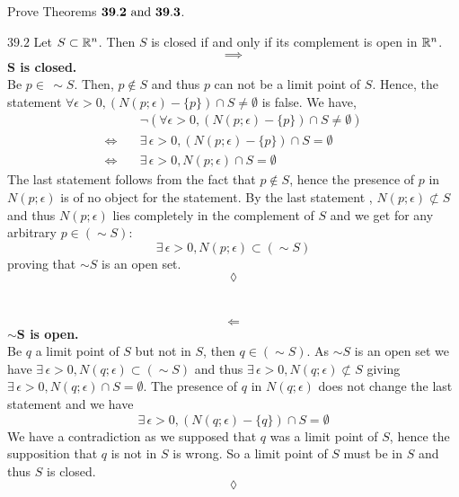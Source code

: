 \subsection{}
\begin{tcolorbox}
Prove Theorems $\mathbf{39.2}\text{ and } \mathbf{39.3}$.
\end{tcolorbox}
$$ $$
$\mathbf{39.2}$ Let $S\subset \mathbb{R}^n$. Then $S$ is closed if and only if its complement is open in $\mathbb{R}^n$.
$$\implies$$
\textbf{$\mathbf{S}$ is closed.}\\
Be $p\in \, \sim S$. Then, $p\not \in  S$ and thus $p$ can not be a limit point of $S$. Hence, the statement $\forall \epsilon >0,\left(N(p;\epsilon)-\{p\}\right)\cap S\neq \emptyset$ is false. We have,
\begin{align*}
&\neg\left(\forall \epsilon >0,\left(N(p;\epsilon)-\{p\}\right)\cap S\neq \emptyset\right)\\
\Leftrightarrow\quad &\exists\, \epsilon >0,\left(N(p;\epsilon)-\{p\}\right)\cap S= \emptyset\\
\Leftrightarrow\quad &\exists\, \epsilon >0,N(p;\epsilon)\cap S= \emptyset
\end{align*}
The last statement follows from the fact that $p\not\in S$, hence the presence of $p$ in $N(p;\epsilon)$ is of no object for the statement.
By the last statement , $N(p;\epsilon)\not\subset S$ and thus $N(p;\epsilon)$ lies completely in the complement of $S$ and we get for any arbitrary $p\in(\sim S)$:
$$\exists\, \epsilon >0,N(p;\epsilon)\subset (\sim S)$$
proving that $\sim S$ is an open set.
$$\lozenge$$\\\\
$$\Leftarrow$$
\textbf{$\mathbf{\sim S}$ is open.}\\
Be $q$ a limit point of $S$ but not in $S$, then $q\in(\sim S)$. As $\sim S$ is an open set we have $\exists\,\epsilon >0, N(q;\epsilon)\subset (\sim S)$ and thus $\exists\,\epsilon >0, N(q;\epsilon)\not \subset S$ giving $\exists\,\epsilon >0, N(q;\epsilon) \cap S=\emptyset$. The presence of $q$ in $N(q;\epsilon)$ does not change the last statement and we have
$$\exists\,\epsilon >0, \left(N(q;\epsilon)-\{q\}\right)\cap S=\emptyset$$
We have a contradiction as we supposed that $q$ was a limit point of $S$, hence the supposition that $q$ is not in $S$ is wrong. So a limit point of $S$ must be in $S$ and thus $S$ is closed.
$$\lozenge$$
